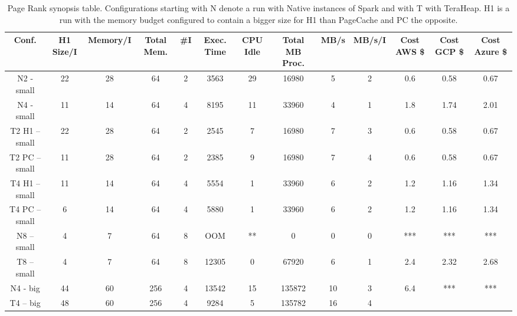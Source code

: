 \iffalse
\begin{table}[htbp]
  \centering
	\begin{subtable}[b]{0.45\linewidth}
  \caption{Page Rank synopsis table. Configurations starting
    with N denote a run with Native instances of Spark and with T with
    TeraHeap. H1 is a run with the memory budget configured to contain
    a bigger size for H1 than PageCache and PC the opposite.}
  \label{tab:pr_table}
        \begin{tabular}{|c|c|c|c|c|c|c|c|c|c|c|c|c|}
      \hline
\textbf{Conf.} & \textbf{H1 Size/I} & \textbf{Memory/I} & \textbf{Total Mem.} & \textbf{\#I} & \textbf{Exec. Time} & \textbf{CPU Idle} & \textbf{Total MB Proc.} & \textbf{MB/s} & \textbf{MB/s/I} & \textbf{Cost AWS \$} & \textbf{Cost GCP \$} & \textbf{Cost Azure \$} \\
        \hline
    N2 - small & 22 & 28 & 64 & 2 & 3563 & 29 & 16980 & 5 & 2 & 0.6 & 0.58 & 0.67 \\
    N4 - small & 11 & 14 & 64 & 4 & 8195 & 11 & 33960 & 4 & 1 & 1.8 & 1.74 & 2.01 \\
    T2 H1 – small & 22 & 28 & 64 & 2 & 2545 & 7 & 16980 & 7 & 3 & 0.6 & 0.58 & 0.67 \\
    T2 PC – small & 11 & 28 & 64 & 2 & 2385 & 9 & 16980 & 7 & 4 & 0.6 & 0.58 & 0.67 \\
    T4 H1 – small & 11 & 14 & 64 & 4 & 5554 & 1 & 33960 & 6 & 2 & 1.2 & 1.16 & 1.34 \\
    T4 PC – small & 6 & 14 & 64 & 4 & 5880 & 1 & 33960 & 6 & 2 & 1.2 & 1.16 & 1.34 \\
    N8 – small & 4 & 7 & 64 & 8 & OOM & ** & 0 & 0 & 0 & *** & *** & *** \\
    T8 – small & 4 & 7 & 64 & 8 & 12305 & 0 & 67920 & 6 & 1 & 2.4 & 2.32 & 2.68 \\
    N4 - big & 44 & 60 & 256 & 4 & 13542 & 15 & 135872 & 10 & 3 & 6.4 & *** & *** \\
    T4 – big & 48 & 60 & 256 & 4 & 9284 & 5 & 135782 & 16 & 4 \\      
	\hline
     \end{tabular}%
\end{subtable}


\end{table}
